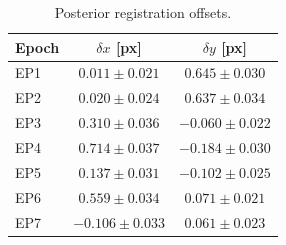 \begin{table}
\caption{Posterior registration offsets.}
\label{tab:offsets}
\centering
\begin{tabular}{lcc}
\hline\hline
Epoch & $\delta x$ [px] & $\delta y$ [px] \\
\hline
EP1 & $0.011 \pm 0.021$ & $0.645 \pm 0.030$ \\
EP2 & $0.020 \pm 0.024$ & $0.637 \pm 0.034$ \\
EP3 & $0.310 \pm 0.036$ & $-0.060 \pm 0.022$ \\
EP4 & $0.714 \pm 0.037$ & $-0.184 \pm 0.030$ \\
EP5 & $0.137 \pm 0.031$ & $-0.102 \pm 0.025$ \\
EP6 & $0.559 \pm 0.034$ & $0.071 \pm 0.021$ \\
EP7 & $-0.106 \pm 0.033$ & $0.061 \pm 0.023$ \\
\hline
\end{tabular}
\end{table}

